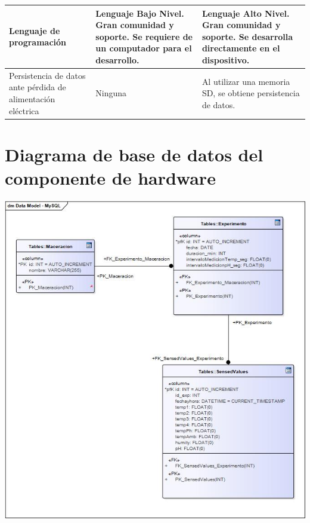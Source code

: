 \begin{longtable}{|p{4cm}|p{5cm}|p{5cm}|}
            Lenguaje de programación & Lenguaje Bajo Nivel. Gran comunidad y soporte. Se requiere de un computador para el desarrollo. & Lenguaje Alto Nivel. Gran comunidad y soporte. Se desarrolla directamente en el dispositivo.
            \\ \hline
                
            Persistencia de datos ante pérdida de alimentación eléctrica & Ninguna & Al utilizar una memoria SD, se obtiene persistencia de datos.
            \\ \hline

            \end{longtable}

    \begin{minipage}{0.95\textwidth}
\chapter{Diagrama de base de datos del componente de hardware}
        \centering
        \includegraphics[scale=0.65]{diagramaBD-Rasp.jpg}
        \label{fig:DiagramaBdRasp}
    
    \end{minipage}
    
